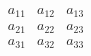 $$\begin{array}{ccc}{a}_{11}&{a}_{12}&{a}_{13}\\ {a}_{21}&{a}_{22}&{a}_{23}\\ {a}_{31}&{a}_{32}&{a}_{33}\end{array}$$
